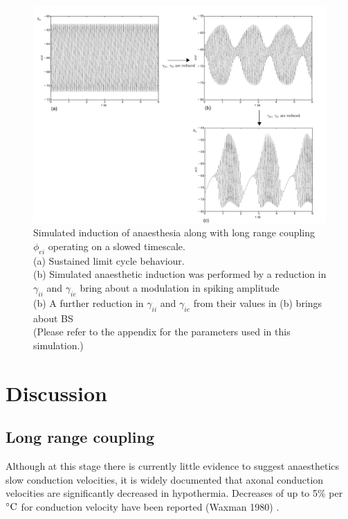 \documentclass[a4paper,12pt]{article}
\begin{document}
\begin{figure}
	\includegraphics[scale=0.75]{frontiers-2012-working-images/figure-5-phi.pdf}

	\label{fig:phi_fast_var}
	\caption{Simulated induction of anaesthesia along with long range coupling $\phi_{ei}$ operating on a slowed timescale.\\
	(a) Sustained limit cycle behaviour.\\
           (b) Simulated anaesthetic induction was performed by a reduction in $\gamma_{ii}$ and $\gamma_{ie}$ bring about a modulation in spiking amplitude\\
           (b) A further reduction in $\gamma_{ii}$ and $\gamma_{ie}$ from their values in (b) brings about BS\\
	(Please refer to the appendix for the parameters used in this simulation.)}
\end{figure}


\section{Discussion}

\subsection{Long range coupling}
Although at this stage there is currently little evidence to suggest anaesthetics slow conduction velocities, it is
widely documented that axonal conduction velocities are significantly decreased in hypothermia. Decreases of up to 5\%
per $^{\circ}{\rm C}$ for conduction velocity have been reported (Waxman 1980) .
\end{document}
